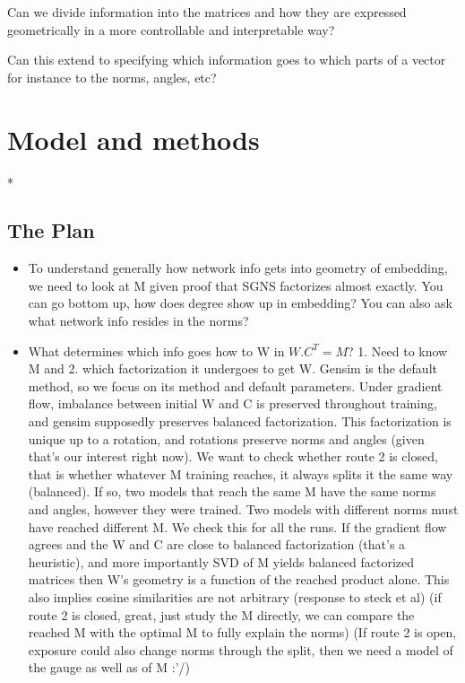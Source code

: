 \documentclass[aps,pre,reprint,superscriptaddress,longbibliography]{revtex4-2}
\begin{document}
Can we divide information into the matrices and how they are expressed geometrically in a more controllable and interpretable way?


Can this extend to specifying which information goes to which parts of a vector for instance to the norms, angles, etc?




\section{Model and methods}
\label{sec:methods}

*\subsection{The Plan} %
\begin{itemize}
    \item To understand generally how network info gets into geometry of embedding, we need to look at M given proof that SGNS factorizes almost exactly. You can go bottom up, how does degree show up in embedding? You can also ask what network info resides in the norms?
    
    \item What determines which info goes how to W in $W . C^T = M$?
    1. Need to know M and 2. which factorization it undergoes to get W. 
    Gensim is the default method, so we focus on its method and default parameters.
    Under gradient flow, imbalance between initial W and C is preserved throughout training, and gensim supposedly preserves balanced factorization.
    This factorization is unique up to a rotation, and rotations preserve norms and angles (given that's our interest right now).
    We want to check whether route 2 is closed, that is whether whatever M training reaches, it always splits it the same way (balanced). 
    If so, two models that reach the same M have the same norms and angles, however they were trained. Two models with different norms must have reached different M.
    We check this for all the runs. If the gradient flow agrees and the W and C are close to balanced factorization (that's a heuristic), and more importantly SVD of M yields balanced factorized matrices then W's geometry is a function of the reached product alone. 
    This also implies cosine similarities are not arbitrary (response to steck et al)
    (if route 2 is closed, great, just study the M directly, we can compare the reached M with the optimal M to fully explain the norms)
    (If route 2 is open, exposure could also change norms through the split, then we need a model of the gauge as well as of M :'/)


\end{itemize}
\end{document}
